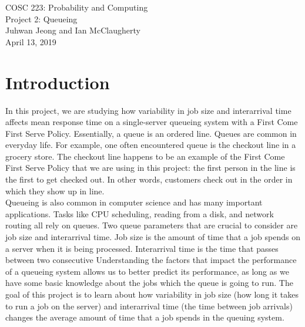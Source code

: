 \documentclass[12pt]{article}
\begin{document}
\begin{center}
\Large{COSC 223: Probability and Computing} \\
\Large{Project 2: Queueing} \\ 
\large{Juhwan Jeong and Ian McClaugherty} \\
\large{April 13, 2019}
\end{center}

\section{Introduction}
In this project, we are studying how variability in job size and interarrival time affects mean response time on a single-server queueing system with a First Come First Serve Policy. Essentially, a queue is an ordered line. Queues are common in everyday life. For example, one often encountered queue is the checkout line in a grocery store. The checkout line happens to be an example of the First Come First Serve Policy that we are using in this project: the first person in the line is the first to get checked out. In other words, customers check out in the order in which they show up in line.  \\ 
Queueing is also common in computer science and has many important applications. Tasks like CPU scheduling, reading from a disk, and network routing all rely on queues. Two queue parameters that are crucial to consider are job size and interarrival time.  Job size is the amount of time that a job spends on a server when it is being processed. Interarrival time is the time that passes between two consecutive Understanding the factors that impact the performance of a queueing system allows us to better predict its performance, as long as we have some basic knowledge about the jobs which the queue is going to run. The goal of this project is to learn about how variability in job size (how long it takes to run a job on the server) and interarrival time (the time between job arrivals) changes the average amount of time that a job spends in the queuing system. 
\end{document}
